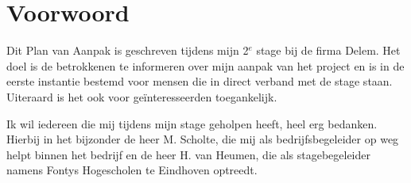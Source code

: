 \section{Voorwoord}

Dit Plan van Aanpak is geschreven tijdens mijn 2$^{e}$ stage bij de firma Delem. Het doel is de betrokkenen te informeren over mijn aanpak van het project en is in de eerste instantie bestemd voor mensen die in direct verband met de stage staan. Uiteraard is het ook voor ge\"interesseerden toegankelijk.

Ik wil iedereen die mij tijdens mijn stage geholpen heeft, heel erg bedanken. Hierbij in het bijzonder de heer M. Scholte, die mij als bedrijfsbegeleider op weg helpt binnen het bedrijf en de heer H. van Heumen, die als stagebegeleider namens Fontys Hogescholen te Eindhoven optreedt.
